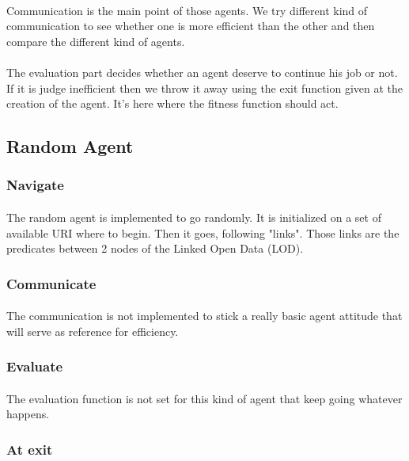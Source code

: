 \documentclass{article}
\begin{document}
	\paragraph{}
		Communication is the main point of those agents.
		We try different kind of communication to see whether one is more efficient than the other
		and then compare the different kind of agents.
	\paragraph{}
		The evaluation part decides whether an agent deserve to continue his job or not.
		If it is judge inefficient then we throw it away using the exit function given at the creation of the agent.
		It's here where the fitness function should act.
	\subsection{Random Agent}
		\subsubsection{Navigate}
			\paragraph{}
			The random agent is implemented to go randomly.
			It is initialized on a set of available URI where to begin.
			Then it goes, following "links".
			Those links are the predicates between 2 nodes of the Linked Open Data (LOD).
		\subsubsection{Communicate}
			\paragraph{}
			The communication is not implemented to stick a really basic agent attitude that will serve as reference for efficiency.
		\subsubsection{Evaluate}
			\paragraph{}
			The evaluation function is not set for this kind of agent that keep going whatever happens.
		\subsubsection{At exit}
\end{document}
